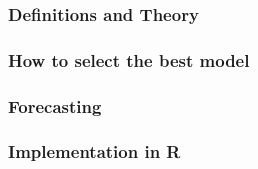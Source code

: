 \subsubsection{Definitions and Theory}

\subsubsection{How to select the best model}

\subsubsection{Forecasting}

\subsubsection{Implementation in R}


